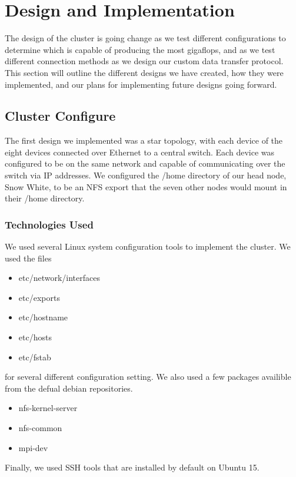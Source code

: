 
\chapter{Design  and Implementation}

The design of the cluster is going change as we test different configurations to determine which is capable of producing the most gigaflops, and as we test different connection methods as we design our custom data transfer protocol. This section will outline the different designs we have created, how they were implemented, and our plans for implementing future designs going forward.
 

\section{Cluster Configure}

The first design we implemented was a star topology, with each device of the eight devices connected over Ethernet to a central switch. Each device was configured to be on the same network and capable of communicating over the switch via IP addresses. We configured the /home directory of our head node, Snow White, to be an NFS export that the seven other nodes would mount in their /home directory. 

\subsection{Technologies  Used}
We used several Linux system configuration tools to implement the cluster. We used the files
\begin{itemize}
	\item etc/network/interfaces
	\item etc/exports
	\item etc/hostname
	\item etc/hosts
	\item etc/fstab
\end{itemize}
for several different configuration setting. We also used a few packages availible from the defual debian repositories.
\begin{itemize}
	\item nfs-kernel-server
	\item nfs-common
	\item mpi-dev
\end{itemize}

Finally, we used SSH tools that are installed by default on Ubuntu 15.


